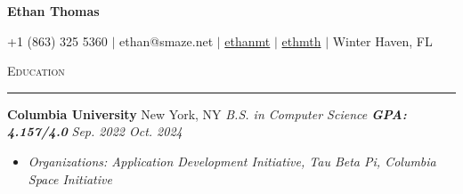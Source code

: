 \documentclass[11pt,letterpaper]{article}
\begin{document}
\centerline{\Huge\bf Ethan Thomas} 
\vspace{1pt}
\centerline{\small{\faMobile \space +1 (863) 325 5360 $|$ \faAt \space ethan@smaze.net $|$ \href{https://www.linkedin.com/in/ethanmt/}{\faLinkedinSquare \space ethanmt} $|$ \href{https://github.com/ethmth}{\faGithub \space ethmth} $|$ \faMapMarker \space Winter Haven, FL}}


\vspace{6pt}
\textsc{\large{Education}} 
\vspace{4pt}
\hrule
\begin{list}{}{\setlength{\leftmargin}{1em}\setlength{\rightmargin}{2pt}}
    \item
                
            \textbf{Columbia University} \hfill  {New York, NY}
            \vspace{2pt} \newline
            \small{\textit{B.S. in Computer Science \quad \textbf{GPA: 4.157/4.0}}} \hfill {\small{\textit{Sep. 2022 \textendash \space Oct. 2024}}}
            \vspace{0pt}
            \begin{itemize}[itemsep=-5pt, topsep=-2pt]
                \item \small{\textit{Organizations: Application Development Initiative, Tau Beta Pi, Columbia Space Initiative}}
            \end{itemize}
\end{list}

\end{document}
